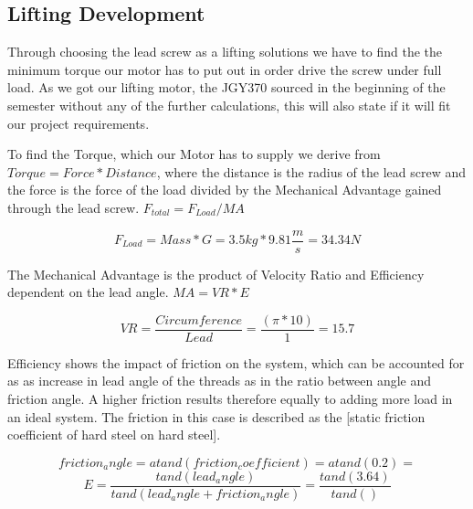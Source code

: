 \documentclass[../report.tex]{subfiles}
\begin{document}
\maketitle

\subsection{Lifting Development}
Through choosing the lead screw as a lifting solutions we have to find the
the minimum torque our motor has to put out in order drive the screw under full load.
As we got our lifting motor, the JGY370 sourced in the beginning of the semester without 
any of the further calculations, this will also state if it will fit our project requirements.


To find the Torque, which our Motor has to supply we derive from $Torque=Force*Distance$, where the 
distance is the radius of the lead screw and the force is the force of the load divided by the Mechanical 
Advantage gained through the lead screw. $F_{total}=F_{Load}/MA$

\[F_{Load}=Mass*G=3.5kg*9.81\frac{m}{s}=34.34N\]

The Mechanical Advantage is the product of Velocity Ratio and Efficiency dependent on the lead 
angle. $MA=VR*E$ 

\[VR=\frac{Circumference}{Lead}=\frac{(\pi*10)}{1}=15.7\]

Efficiency shows the impact of friction on the system, which can be accounted for as as increase in lead angle of the threads 
as in the ratio between angle and friction angle. A higher friction results therefore equally to adding more load in an ideal 
system. The friction in this case is described as the \cite{friction_coefficient}[static 
friction coefficient of hard steel on hard steel]. 

\[friction_angle= atand(friction_coefficient)= atand(0.2)=\]
\[E=\frac{tand(lead_angle)}{tand(lead_angle+friction_angle)}=\frac{tand(3.64)}{tand()}\]
\end{document}
